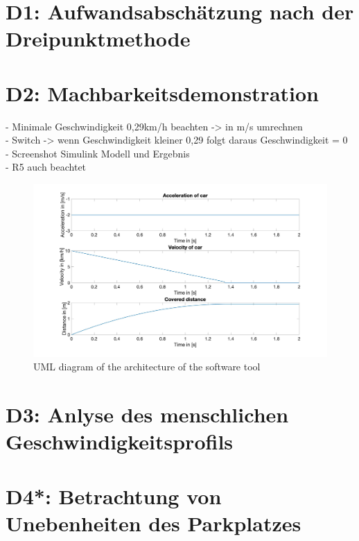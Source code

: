 
\chapter{D1: Aufwandsabschätzung nach der Dreipunktmethode}\label{cha:D1}

\chapter{D2: Machbarkeitsdemonstration}\label{cha:D2}

- Minimale Geschwindigkeit 0,29km/h beachten -> in m/s umrechnen \\
- Switch -> wenn Geschwindigkeit kleiner 0,29 folgt daraus Geschwindigkeit = 0 \\
- Screenshot Simulink Modell und Ergebnis\\
- R5 auch beachtet \\

\begin{figure}[H]
\centering
\includegraphics[width=1\textwidth]{images/D2_plot.jpg}
\caption{UML diagram of the architecture of the software tool}
\label{fig:ConceptArchitectureOverview}
\end{figure}

\chapter{D3: Anlyse des menschlichen Geschwindigkeitsprofils}\label{cha:D3}

\chapter{D4*: Betrachtung von Unebenheiten des Parkplatzes}\label{cha:D4}

